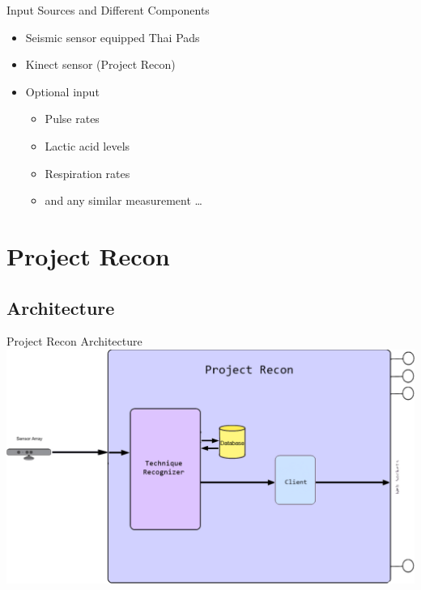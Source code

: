 \documentclass{beamer}
\begin{document}
\begin{frame}{Input Sources and Different Components}
 \begin{itemize}
  \item
   Seismic sensor equipped Thai Pads
  \item
    Kinect sensor (Project Recon)
  \item Optional input
  \begin{itemize}
   \item Pulse rates
   \item Lactic acid levels
   \item Respiration rates
   \item and any similar measurement \dots
  \end{itemize}
 \end{itemize}
\end{frame}

\section{Project Recon}

\subsection{Architecture}

\begin{frame}{Project Recon Architecture}
 \includegraphics[scale = 0.3] {project_Recon_diagram.png}
\end{frame}
\end{document}
